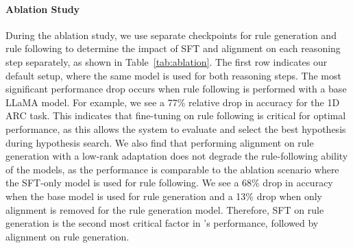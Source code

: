 \paragraph{Ablation Study} During the ablation study, we use separate checkpoints for rule generation and rule following to determine the impact of SFT and alignment on each reasoning step separately, as shown in Table~\ref{tab:ablation}. The first row indicates our default setup, where the same model is used for both reasoning steps. The most significant performance drop occurs when rule following is performed with a base LLaMA model. For example, we see a 77\% relative drop in accuracy for the 1D ARC task. This indicates that fine-tuning on rule following is critical for optimal performance, as this allows the system to evaluate and select the best hypothesis during hypothesis search. We also find that performing alignment on rule generation with a low-rank adaptation does not degrade the rule-following ability of the models, as the performance is comparable to the ablation scenario where the SFT-only model is used for rule following. We see a 68\% drop in accuracy when the base model is used for rule generation and a 13\% drop when only alignment is removed for the rule generation model. Therefore, SFT on rule generation is the second most critical factor in \proposed's performance, followed by alignment on rule generation.


